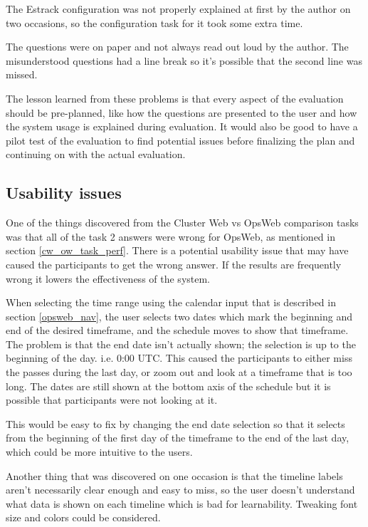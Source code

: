 The Estrack configuration was not properly explained at first by the author on two occasions, so the configuration task for it took some extra time.

The questions were on paper and not always read out loud by the author. The misunderstood questions had a line break so it's possible that the second line was missed. 

The lesson learned from these problems is that every aspect of the evaluation should be pre-planned, like how the questions are presented to the user and how the system usage is explained during evaluation. It would also be good to have a pilot test of the evaluation to find potential issues before finalizing the plan and continuing on with the actual evaluation.

\subsection{Usability issues} \label{usability_issues}
One of the things discovered from the Cluster Web vs OpsWeb comparison tasks was that all of the task 2 answers were wrong for OpsWeb, as mentioned in section \ref{cw_ow_task_perf}. There is a potential usability issue that may have caused the participants to get the wrong answer. If the results are frequently wrong it lowers the effectiveness of the system.

When selecting the time range using the calendar input that is described in section \ref{opsweb_nav}, the user selects two dates which mark the beginning and end of the desired timeframe, and the schedule moves to show that timeframe. The problem is that the end date isn't actually shown; the selection is up to the beginning of the day. i.e. 0:00 UTC. This caused the participants to either miss the passes during the last day, or zoom out and look at a timeframe that is too long. The dates are still shown at the bottom axis of the schedule but it is possible that participants were not looking at it.

This would be easy to fix by changing the end date selection so that it selects from the beginning of the first day of the timeframe to the end of the last day, which could be more intuitive to the users.

Another thing that was discovered on one occasion is that the timeline labels aren't necessarily clear enough and easy to miss, so the user doesn't understand what data is shown on each timeline which is bad for learnability. Tweaking font size and colors could be considered.

